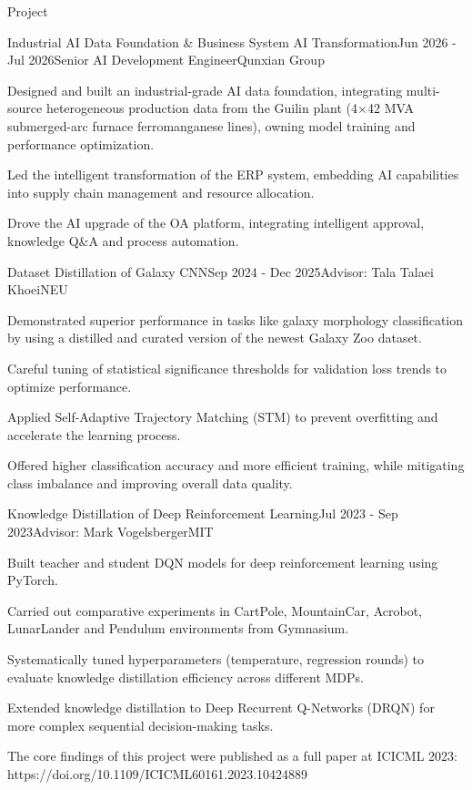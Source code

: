 \documentclass{resume} %
\begin{document}
\begin{rSection}{Project}

    \begin{rSubsection}{Industrial AI Data Foundation \& Business System AI Transformation}{Jun 2026 - Jul 2026}{Senior AI Development Engineer}{Qunxian Group}
        \item Designed and built an industrial-grade AI data foundation, integrating multi-source heterogeneous production data from the Guilin plant (4$\times$42 MVA submerged-arc furnace ferromanganese lines), owning model training and performance optimization.
        \item Led the intelligent transformation of the ERP system, embedding AI capabilities into supply chain management and resource allocation.
        \item Drove the AI upgrade of the OA platform, integrating intelligent approval, knowledge Q\&A and process automation.
    \end{rSubsection}

    \begin{rSubsection}{Dataset Distillation of Galaxy CNN}{Sep 2024 - Dec 2025}{Advisor: Tala Talaei Khoei}{NEU}
        \item Demonstrated superior performance in tasks like galaxy morphology classification by using a distilled and curated version of the newest Galaxy Zoo dataset.
        \item Careful tuning of statistical significance thresholds for validation loss trends to optimize performance.
        \item Applied Self-Adaptive Trajectory Matching (STM) to prevent overfitting and accelerate the learning process.
        \item Offered higher classification accuracy and more efficient training, while mitigating class imbalance and improving overall data quality.
    \end{rSubsection}

    \begin{rSubsection}{Knowledge Distillation of Deep Reinforcement Learning}{Jul 2023 - Sep 2023}{Advisor: Mark Vogelsberger}{MIT}
        \item Built teacher and student DQN models for deep reinforcement learning using PyTorch.
        \item Carried out comparative experiments in CartPole, MountainCar, Acrobot, LunarLander and Pendulum environments from Gymnasium.
        \item Systematically tuned hyperparameters (temperature, regression rounds) to evaluate knowledge distillation efficiency across different MDPs.
        \item Extended knowledge distillation to Deep Recurrent Q-Networks (DRQN) for more complex sequential decision-making tasks.
        \item The core findings of this project were published as a full paper at ICICML 2023: \\https://doi.org/10.1109/ICICML60161.2023.10424889
    \end{rSubsection}


\end{rSection}
\end{document}
